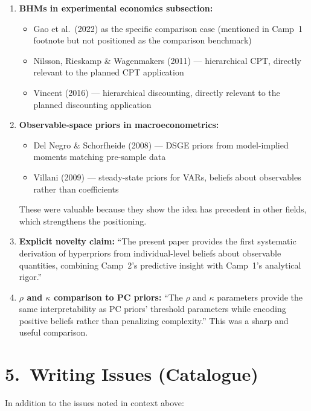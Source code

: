 \documentclass[12pt,a4paper]{article}
\begin{document}
\begin{enumerate}[leftmargin=1.5em]
  \item \textbf{BHMs in experimental economics subsection:}
    \begin{itemize}
      \item Gao et al.\ (2022) as the specific comparison case (mentioned
        in Camp~1 footnote but not positioned as the comparison benchmark)
      \item Nilsson, Rieskamp \& Wagenmakers (2011) --- hierarchical CPT,
        directly relevant to the planned CPT application
      \item Vincent (2016) --- hierarchical discounting, directly relevant to
        the planned discounting application
    \end{itemize}

  \item \textbf{Observable-space priors in macroeconometrics:}
    \begin{itemize}
      \item Del Negro \& Schorfheide (2008) --- DSGE priors from
        model-implied moments matching pre-sample data
      \item Villani (2009) --- steady-state priors for VARs, beliefs about
        observables rather than coefficients
    \end{itemize}
    These were valuable because they show the idea has precedent in other
    fields, which strengthens the positioning.

  \item \textbf{Explicit novelty claim:} ``The present paper provides the
    first systematic derivation of hyperpriors from individual-level beliefs
    about observable quantities, combining Camp~2's predictive insight with
    Camp~1's analytical rigor.''

  \item \textbf{$\rho$ and $\kappa$ comparison to PC priors:} ``The $\rho$
    and $\kappa$ parameters provide the same interpretability as PC priors'
    threshold parameters while encoding positive beliefs rather than
    penalizing complexity.'' This was a sharp and useful comparison.
\end{enumerate}


\section{5.\ Writing Issues (Catalogue)}

In addition to the issues noted in context above:
\end{document}
